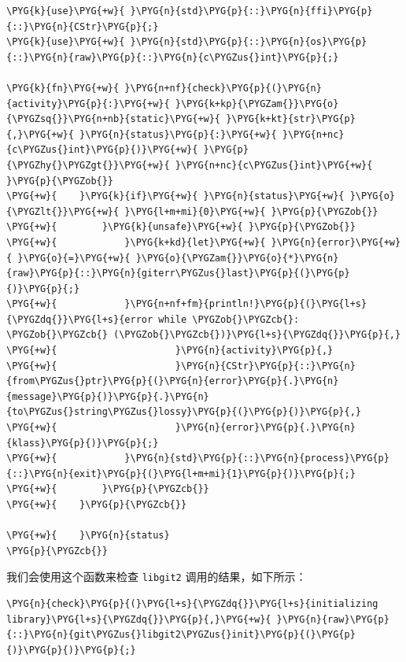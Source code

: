\begin{Verbatim}[commandchars=\\\{\},breaklines=true,breakanywhere=true,fontsize=\codefont,xleftmargin=17bp]
\PYG{k}{use}\PYG{+w}{ }\PYG{n}{std}\PYG{p}{::}\PYG{n}{ffi}\PYG{p}{::}\PYG{n}{CStr}\PYG{p}{;}
\PYG{k}{use}\PYG{+w}{ }\PYG{n}{std}\PYG{p}{::}\PYG{n}{os}\PYG{p}{::}\PYG{n}{raw}\PYG{p}{::}\PYG{n}{c\PYGZus{}int}\PYG{p}{;}

\PYG{k}{fn}\PYG{+w}{ }\PYG{n+nf}{check}\PYG{p}{(}\PYG{n}{activity}\PYG{p}{:}\PYG{+w}{ }\PYG{k+kp}{\PYGZam{}}\PYG{o}{\PYGZsq{}}\PYG{n+nb}{static}\PYG{+w}{ }\PYG{k+kt}{str}\PYG{p}{,}\PYG{+w}{ }\PYG{n}{status}\PYG{p}{:}\PYG{+w}{ }\PYG{n+nc}{c\PYGZus{}int}\PYG{p}{)}\PYG{+w}{ }\PYG{p}{\PYGZhy{}\PYGZgt{}}\PYG{+w}{ }\PYG{n+nc}{c\PYGZus{}int}\PYG{+w}{ }\PYG{p}{\PYGZob{}}
\PYG{+w}{    }\PYG{k}{if}\PYG{+w}{ }\PYG{n}{status}\PYG{+w}{ }\PYG{o}{\PYGZlt{}}\PYG{+w}{ }\PYG{l+m+mi}{0}\PYG{+w}{ }\PYG{p}{\PYGZob{}}
\PYG{+w}{        }\PYG{k}{unsafe}\PYG{+w}{ }\PYG{p}{\PYGZob{}}
\PYG{+w}{            }\PYG{k+kd}{let}\PYG{+w}{ }\PYG{n}{error}\PYG{+w}{ }\PYG{o}{=}\PYG{+w}{ }\PYG{o}{\PYGZam{}}\PYG{o}{*}\PYG{n}{raw}\PYG{p}{::}\PYG{n}{giterr\PYGZus{}last}\PYG{p}{(}\PYG{p}{)}\PYG{p}{;}
\PYG{+w}{            }\PYG{n+nf+fm}{println!}\PYG{p}{(}\PYG{l+s}{\PYGZdq{}}\PYG{l+s}{error while \PYGZob{}\PYGZcb{}: \PYGZob{}\PYGZcb{} (\PYGZob{}\PYGZcb{})}\PYG{l+s}{\PYGZdq{}}\PYG{p}{,}
\PYG{+w}{                     }\PYG{n}{activity}\PYG{p}{,}
\PYG{+w}{                     }\PYG{n}{CStr}\PYG{p}{::}\PYG{n}{from\PYGZus{}ptr}\PYG{p}{(}\PYG{n}{error}\PYG{p}{.}\PYG{n}{message}\PYG{p}{)}\PYG{p}{.}\PYG{n}{to\PYGZus{}string\PYGZus{}lossy}\PYG{p}{(}\PYG{p}{)}\PYG{p}{,}
\PYG{+w}{                     }\PYG{n}{error}\PYG{p}{.}\PYG{n}{klass}\PYG{p}{)}\PYG{p}{;}
\PYG{+w}{            }\PYG{n}{std}\PYG{p}{::}\PYG{n}{process}\PYG{p}{::}\PYG{n}{exit}\PYG{p}{(}\PYG{l+m+mi}{1}\PYG{p}{)}\PYG{p}{;}
\PYG{+w}{        }\PYG{p}{\PYGZcb{}}
\PYG{+w}{    }\PYG{p}{\PYGZcb{}}

\PYG{+w}{    }\PYG{n}{status}
\PYG{p}{\PYGZcb{}}
\end{Verbatim}

我们会使用这个函数来检查 \texttt{libgit2} 调用的结果，如下所示：

\begin{Verbatim}[commandchars=\\\{\},breaklines=true,breakanywhere=true,fontsize=\codefont,xleftmargin=17bp]
\PYG{n}{check}\PYG{p}{(}\PYG{l+s}{\PYGZdq{}}\PYG{l+s}{initializing library}\PYG{l+s}{\PYGZdq{}}\PYG{p}{,}\PYG{+w}{ }\PYG{n}{raw}\PYG{p}{::}\PYG{n}{git\PYGZus{}libgit2\PYGZus{}init}\PYG{p}{(}\PYG{p}{)}\PYG{p}{)}\PYG{p}{;}
\end{Verbatim}

